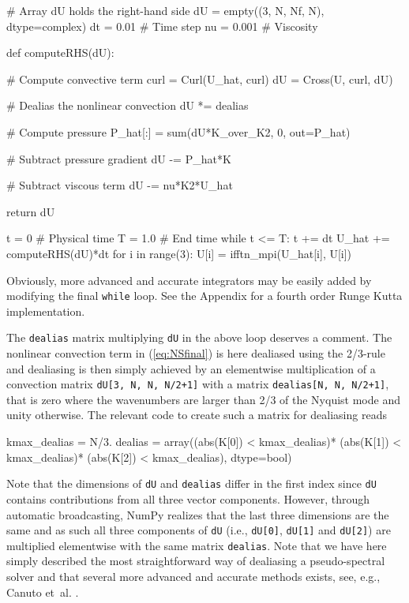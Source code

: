 \documentclass[final,3p,times,twocolumn]{elsarticle}
\newcommand{\inpyth}{\lstinline[style=inlinestyle]} %[]%
\begin{document}
\begin{python}
# Array dU holds the right-hand side
dU = empty((3, N, Nf, N), dtype=complex)  
dt = 0.01    # Time step
nu = 0.001   # Viscosity

def computeRHS(dU):

    # Compute convective term
    curl = Curl(U_hat, curl)
    dU = Cross(U, curl, dU)

    # Dealias the nonlinear convection
    dU *= dealias

    # Compute pressure
    P_hat[:] = sum(dU*K_over_K2, 0, 
                   out=P_hat)

    # Subtract pressure gradient
    dU -= P_hat*K

    # Subtract viscous term
    dU -= nu*K2*U_hat

    return dU

t = 0        # Physical time
T = 1.0      # End time
while t <= T:
    t += dt
    U_hat += computeRHS(dU)*dt
    for i in range(3):
        U[i] = ifftn_mpi(U_hat[i], U[i])

\end{python}
Obviously, more advanced and accurate integrators may be easily added by modifying the final \inpyth{while} loop. See the Appendix for a fourth order Runge Kutta implementation.

The \inpyth{dealias} matrix multiplying \inpyth{dU} in the above
loop deserves a comment.
The nonlinear convection term in (\ref{eq:NSfinal}) is here dealiased using the 2/3-rule \cite{orzag71} and dealiasing is then simply achieved by an elementwise multiplication of a convection matrix \inpyth{dU[3, N, N, N/2+1]} with a matrix \inpyth{dealias[N, N, N/2+1]}, that is zero where the wavenumbers are larger than 2/3 of the Nyquist mode and unity otherwise. The relevant code to create such a matrix for dealiasing reads

\begin{python}
kmax_dealias = N/3.
dealias = array((abs(K[0]) < kmax_dealias)*
                (abs(K[1]) < kmax_dealias)*
                (abs(K[2]) < kmax_dealias), 
                dtype=bool)
\end{python}
Note that the dimensions of \inpyth{dU} and \inpyth{dealias} differ in the 
first index since \inpyth{dU} contains contributions from all three vector 
components. However, through automatic broadcasting, NumPy realizes that the 
last three dimensions are the same and as such all three components of 
\inpyth{dU} (i.e.,  \inpyth{dU[0]}, \inpyth{dU[1]} and  \inpyth{dU[2]}) are 
multiplied elementwise with the same matrix \inpyth{dealias}. Note that we have 
here simply described the most straightforward way of dealiasing a 
pseudo-spectral solver and that several more advanced and accurate methods 
exists, see, e.g., Canuto et~al. \cite{canuto1988}.
\end{document}
